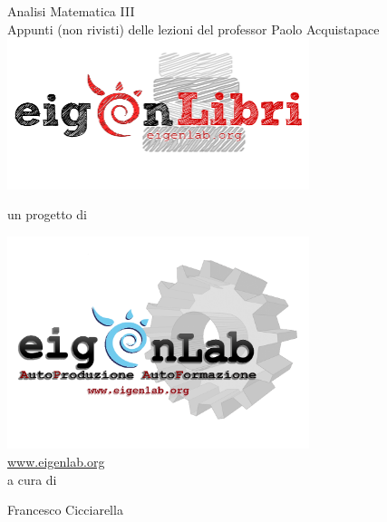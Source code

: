 \documentclass[a4paper,12pt]{report}
\theoremstyle{plain}
\theoremstyle{definition}
\theoremstyle{remark}
\numberwithin{equation}{section}
\begin{document}
 \begin{titlepage}
\centering
{\Huge Analisi Matematica III}\\
\vspace*{0.5cm}
{\small Appunti (non rivisti) delle lezioni del professor Paolo Acquistapace}
 \\
\includegraphics[width=250pt,keepaspectratio=true]{Addons/eigenLibrichiaro}
\begin{center}
un progetto di
\end{center}
\includegraphics[width=250pt,keepaspectratio=true]{Addons/eigenlabinvertito2.png} \\
\url{www.eigenlab.org}
 \\
{\small a cura di}\\
\vspace*{0.5cm}
{\normalsize Francesco Cicciarella\par}
\end{titlepage}
\pagebreak
\end{document}
